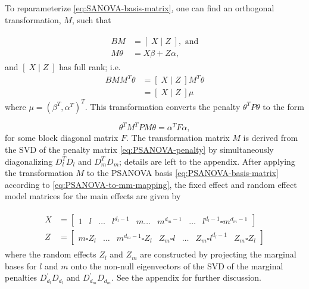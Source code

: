 \documentclass[12pt]{article}
\newcommand{\ms}{\scriptscriptstyle}
\theoremstyle{definition}
\begin{document}
To reparameterize \ref{eq:SANOVA-basis-matrix}, one can find an orthogonal transformation, $M$, such that

\begin{align}
\begin{split} \label{eq:PSANOVA-to-mm-mapping}
BM &= \left[\; X \; \vert \; Z \; \right], \mbox{ and}\\
M \theta &= X \beta + Z \alpha,
\end{split}
\end{align}
\noindent
and $\left[\; X \; \vert \; Z \; \right]$ has full rank; i.e.
\begin{align*}
B M M^T \theta &= \left[\; X \; \vert \; Z \; \right]M^T \theta \\
&= \left[\; X \; \vert \; Z \; \right] \mu
\end{align*}
\noindent
where $\mu = \left(\beta^T,\alpha^T\right)^T$. This transformation converts the penalty $\theta^T P \theta$ to the form

\begin{equation*}
\theta^T M^T P M \theta = \alpha^T F \alpha,
\end{equation*}
\noindent
for some block diagonal matrix $F$.  The transformation matrix $M$ is derived from the SVD of the penalty matrix \ref{eq:PSANOVA-penalty} by simultaneously diagonalizing $D_l^T D_l$ and $D_m^T D_m$; details are left to the appendix. After applying the transformation $M$ to the PSANOVA basis \ref{eq:PSANOVA-basis-matrix} according to \ref{eq:PSANOVA-to-mm-mapping}, the fixed effect and random effect model matrices for the main effects are given by 


\begin{align} 
\begin{split} \label{eq:PSANOVA-fixed-random-effect-matrices}
X &= \left[ \begin{array}{c|c|c|c|c|c|c|c|c} 1 & l  & \dots & l^{\ms d_{\ms l}-1}& m \dots & m^{\ms d_{\ms m}-1} & \dots &  l^{\ms d_{\ms l}-1} \square m^{\ms d_{\ms m}-1} \end{array} \right] \\
Z &= \left[ \begin{array}{c|c|c|c|c|c|c} m \square Z_l & \dots &  m^{\ms d_{\ms m}-1} \square Z_l & Z_m \square l & \dots & Z_m \square  l^{\ms d_{\ms l}-1} & Z_m \square Z_l \end{array} \right]
\end{split}
\end{align}
\noindent 
where the random effects $Z_l$ and $Z_m$ are constructed by projecting the marginal bases for $l$ and $m$ onto the non-null eigenvectors of the SVD of the marginal penalties $D_{\ms d_{\ms l}}^\prime D_{\ms d_{\ms l}}$ and $D_{\ms d_{\ms m}}^\prime D_{\ms d_{\ms m}}$. See the appendix for further discussion. 
\end{document}
